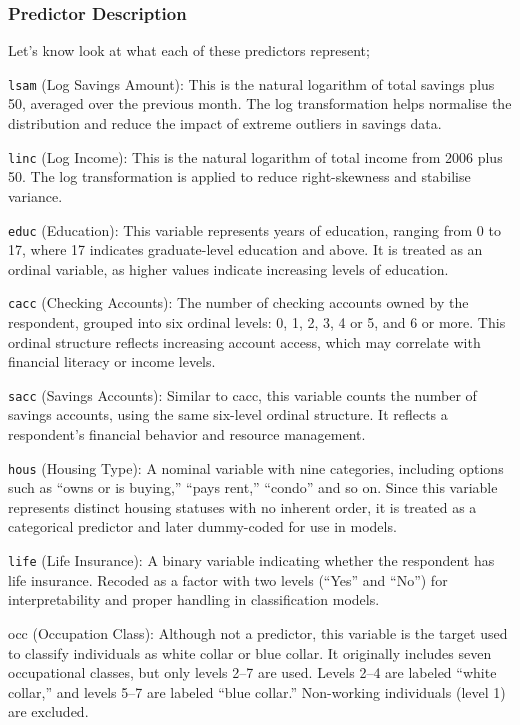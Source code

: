 \documentclass[
]{article}
\begin{document}
\subsubsection{Predictor Description}\label{predictor-description}

Let's know look at what each of these predictors represent;

\texttt{lsam} (Log Savings Amount): This is the natural logarithm of
total savings plus 50, averaged over the previous month. The log
transformation helps normalise the distribution and reduce the impact of
extreme outliers in savings data.

\texttt{linc} (Log Income): This is the natural logarithm of total
income from 2006 plus 50. The log transformation is applied to reduce
right-skewness and stabilise variance.

\texttt{educ} (Education): This variable represents years of education,
ranging from 0 to 17, where 17 indicates graduate-level education and
above. It is treated as an ordinal variable, as higher values indicate
increasing levels of education.

\texttt{cacc} (Checking Accounts): The number of checking accounts owned
by the respondent, grouped into six ordinal levels: 0, 1, 2, 3, 4 or 5,
and 6 or more. This ordinal structure reflects increasing account
access, which may correlate with financial literacy or income levels.

\texttt{sacc} (Savings Accounts): Similar to cacc, this variable counts
the number of savings accounts, using the same six-level ordinal
structure. It reflects a respondent's financial behavior and resource
management.

\texttt{hous} (Housing Type): A nominal variable with nine categories,
including options such as ``owns or is buying,'' ``pays rent,''
``condo'' and so on. Since this variable represents distinct housing
statuses with no inherent order, it is treated as a categorical
predictor and later dummy-coded for use in models.

\texttt{life} (Life Insurance): A binary variable indicating whether the
respondent has life insurance. Recoded as a factor with two levels
(``Yes'' and ``No'') for interpretability and proper handling in
classification models.

occ (Occupation Class): Although not a predictor, this variable is the
target used to classify individuals as white collar or blue collar. It
originally includes seven occupational classes, but only levels 2--7 are
used. Levels 2--4 are labeled ``white collar,'' and levels 5--7 are
labeled ``blue collar.'' Non-working individuals (level 1) are excluded.
\end{document}

